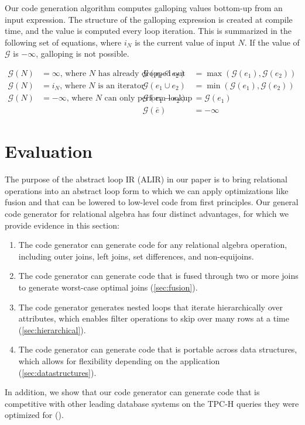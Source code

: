 \documentclass[acmsmall,screen,nonacm]{acmart}\settopmatter{printfolios=true,printccs=false,printacmref=false}
\newcommand*{\gallopV}{\mathcal{G}}
\begin{document}
Our code generation algorithm computes galloping values bottom-up from an input expression.
The structure of the galloping expression is created at compile time,
and the value is computed every loop iteration.
This is summarized in the following set of equations, where $i_N$ is
the current value of input $N$. If the value of $\gallopV$ is $-\infty$, galloping is not possible.

\vspace{-\abovedisplayskip}
{\footnotesize\begin{align*}
    \gallopV(N) &= \infty \text{, where $N$ has already dropped out} &
        \gallopV(e_1 \cap e_2) &= \max(\gallopV(e_1), \gallopV(e_2)) \\
    \gallopV(N) &= i_N \text{, where $N$ is an iterator} &
        \gallopV(e_1 \cup e_2) &= \min(\gallopV(e_1), \gallopV(e_2)) \\
    \gallopV(N) &= -\infty \text{, where $N$ can only perform lookup} &
       \gallopV(e_1 - e_2) &= \gallopV(e_1) \\
    & & \gallopV(\bar{e}) &= -\infty
\end{align*}}



\section{Evaluation}
\label{sec:evaluation}

The purpose of the abstract loop IR (ALIR) in our paper is to bring relational operations into an abstract loop form to which we can apply optimizations like fusion and that can be lowered to low-level code from first principles. Our general code generator for relational algebra has four distinct advantages, for which we provide evidence in this section:
\begin{enumerate}
    \item The code generator can generate code for any relational algebra operation, including outer joins, left joins, set differences, and non-equijoins.
    \item The code generator can generate code that is fused through two or more joins to generate worst-case optimal joins (\ref{sec:fusion}).
    \item The code generator generates nested loops that iterate hierarchically over attributes, which enables filter operations to skip over many rows at a time (\ref{sec:hierarchical}).
    \item The code generator can generate code that is portable across data structures, which allows for flexibility depending on the application (\ref{sec:datastructures}).
\end{enumerate}
In addition, we show that our code generator can generate code that is competitive with other leading database systems on the TPC-H queries they were optimized for ().
\end{document}
